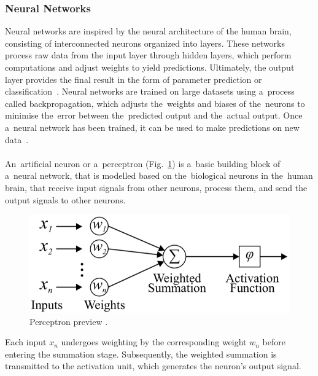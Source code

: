 \documentclass[12pt]{article}
\begin{document}
\subsubsection{Neural Networks}
Neural networks are inspired by the neural architecture of the human brain,
consisting of interconnected neurons organized
into layers. These networks process raw data from the input layer through hidden layers,
which perform computations and adjust weights to yield predictions. Ultimately, the output
layer provides the final result in the form of parameter prediction or classification~\cite{WOS:001091632800001}.
%
Neural networks are trained on large datasets using a~process called backpropagation, which
adjusts the~weights and biases of the~neurons to minimise the~error between the~predicted output
and the~actual output. Once a~neural network has been trained, it can be used to make predictions
on new data~\cite{WOS:000659928700099}.\\
\\
An~artificial neuron or a~perceptron (Fig.~\ref{fig:perceptron}) is a~basic building block
of a~neural network, that is modelled based on the~biological neurons in the~human brain,
that receive input signals from other neurons, process them, and send the output signals to
other neurons.
%
\begin{center}
    \begin{figure}[!ht]
        \centering
        \includegraphics[width=0.8\columnwidth]{nn}
        \caption{Perceptron preview \cite{WOS:000466708200028}.}
        \label{fig:perceptron}
    \end{figure}
\end{center}
Each input $x_n$ undergoes weighting by the
corresponding weight $w_n$ before entering the summation stage. Subsequently, the weighted
summation is transmitted to the activation unit, which generates the neuron's output signal.\\
\\
\end{document}

